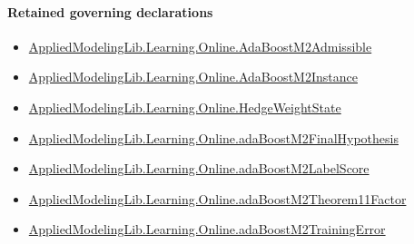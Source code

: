 \documentclass[10pt]{article}
\begin{document}
\paragraph{Retained governing declarations}
\begin{itemize}\raggedright
\item \hyperlink{governing-declaration-759a42c12a885c8e}{Applied\allowbreak{}Modeling\allowbreak{}Lib.\allowbreak{}Learning.\allowbreak{}Online.\allowbreak{}Ada\allowbreak{}Boost\allowbreak{}M2\allowbreak{}Admissible}
\item \hyperlink{governing-declaration-ffa271cbdc97d5db}{Applied\allowbreak{}Modeling\allowbreak{}Lib.\allowbreak{}Learning.\allowbreak{}Online.\allowbreak{}Ada\allowbreak{}Boost\allowbreak{}M2\allowbreak{}Instance}
\item \hyperlink{library-prerequisite-8196082d02788389}{Applied\allowbreak{}Modeling\allowbreak{}Lib.\allowbreak{}Learning.\allowbreak{}Online.\allowbreak{}Hedge\allowbreak{}Weight\allowbreak{}State}
\item \hyperlink{governing-declaration-b6e8a0444f293c12}{Applied\allowbreak{}Modeling\allowbreak{}Lib.\allowbreak{}Learning.\allowbreak{}Online.\allowbreak{}ada\allowbreak{}Boost\allowbreak{}M2\allowbreak{}Final\allowbreak{}Hypothesis}
\item \hyperlink{library-prerequisite-69e0e550b668ec14}{Applied\allowbreak{}Modeling\allowbreak{}Lib.\allowbreak{}Learning.\allowbreak{}Online.\allowbreak{}ada\allowbreak{}Boost\allowbreak{}M2\allowbreak{}Label\allowbreak{}Score}
\item \hyperlink{governing-declaration-48d05fd7d4689ed2}{Applied\allowbreak{}Modeling\allowbreak{}Lib.\allowbreak{}Learning.\allowbreak{}Online.\allowbreak{}ada\allowbreak{}Boost\allowbreak{}M2\allowbreak{}Theorem11\allowbreak{}Factor}
\item \hyperlink{governing-declaration-24e235ff7562e01c}{Applied\allowbreak{}Modeling\allowbreak{}Lib.\allowbreak{}Learning.\allowbreak{}Online.\allowbreak{}ada\allowbreak{}Boost\allowbreak{}M2\allowbreak{}Training\allowbreak{}Error}
\end{itemize}
\end{document}
